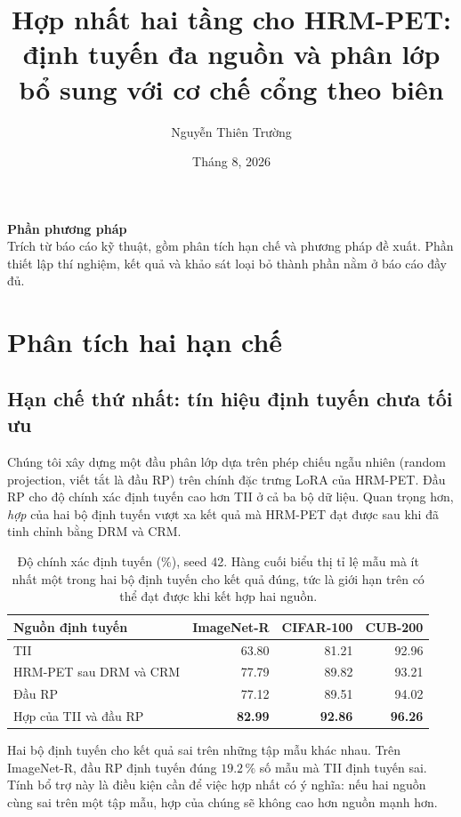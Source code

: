 \documentclass[11pt,a4paper]{article}
\title{\bfseries Hợp nhất hai tầng cho HRM-PET:\\
định tuyến đa nguồn và phân lớp bổ sung với cơ chế cổng theo biên}
\author{Nguyễn Thiên Trường}
\date{Tháng 8, 2026}
\begin{document}
\begin{center}
{\large\bfseries Phần phương pháp}\\[2pt]
{\small Trích từ báo cáo kỹ thuật, gồm phân tích hạn chế và phương pháp đề
xuất. Phần thiết lập thí nghiệm, kết quả và khảo sát loại bỏ thành phần nằm ở
báo cáo đầy đủ.}
\end{center}

\bigskip

\section{Phân tích hai hạn chế}
\label{sec:analysis}

\subsection{Hạn chế thứ nhất: tín hiệu định tuyến chưa tối ưu}

Chúng tôi xây dựng một đầu phân lớp dựa trên phép chiếu ngẫu nhiên (random
projection, viết tắt là đầu RP) trên chính đặc trưng LoRA của HRM-PET. Đầu RP
cho độ chính xác định tuyến cao hơn TII ở cả ba bộ dữ liệu. Quan trọng hơn,
\emph{hợp} của hai bộ định tuyến vượt xa kết quả mà HRM-PET đạt được sau khi đã
tinh chỉnh bằng DRM và CRM.

\begin{table}[htbp]
\centering
\caption{Độ chính xác định tuyến (\%), seed 42. Hàng cuối biểu thị tỉ lệ mẫu mà
ít nhất một trong hai bộ định tuyến cho kết quả đúng, tức là giới hạn trên có
thể đạt được khi kết hợp hai nguồn.}
\label{tab:routing}
\begin{tabular}{lrrr}
\toprule
Nguồn định tuyến & ImageNet-R & CIFAR-100 & CUB-200 \\
\midrule
TII                        & 63.80 & 81.21 & 92.96 \\
HRM-PET sau DRM và CRM     & 77.79 & 89.82 & 93.21 \\
Đầu RP                     & 77.12 & 89.51 & 94.02 \\
\midrule
Hợp của TII và đầu RP      & \textbf{82.99} & \textbf{92.86} & \textbf{96.26} \\
\bottomrule
\end{tabular}
\end{table}

Hai bộ định tuyến cho kết quả sai trên những tập mẫu khác nhau. Trên ImageNet-R,
đầu RP định tuyến đúng $19.2\,\%$ số mẫu mà TII định tuyến sai. Tính bổ trợ này
là điều kiện cần để việc hợp nhất có ý nghĩa: nếu hai nguồn cùng sai trên một
tập mẫu, hợp của chúng sẽ không cao hơn nguồn mạnh hơn.
\end{document}
